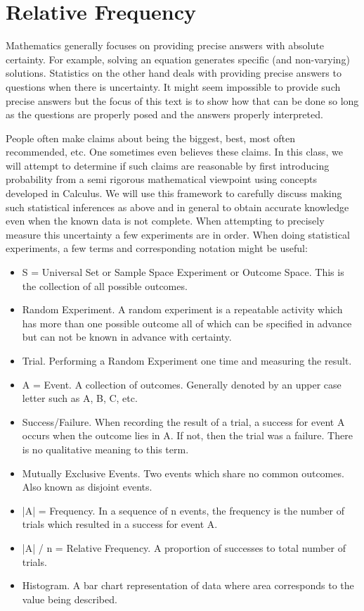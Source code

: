 \documentclass[10pt,]{book}
\theoremstyle{plain}
\theoremstyle{definition}
\theoremstyle{definition}
\theoremstyle{definition}
\numberwithin{equation}{section}
\begin{document}
\section[{Relative Frequency}]{Relative Frequency}\label{RelativeFrequency}
\typeout{************************************************}
\typeout{************************************************}
Mathematics generally focuses on providing precise answers with absolute certainty. For example, solving an equation generates specific (and non-varying) solutions. Statistics on the other hand deals with providing precise answers to questions when there is uncertainty. It might seem impossible to provide such precise answers but the focus of this text is to show how that can be done so long as the questions are properly posed and the answers properly interpreted.%
\par
People often make claims about being the biggest, best, most often recommended, etc. One sometimes even believes these claims. In this class, we will attempt to determine if such claims are reasonable by first introducing probability from a semi rigorous mathematical viewpoint using concepts developed in Calculus. We will use this framework to carefully discuss making such statistical inferences as above and in general to obtain accurate knowledge even when the known data is not complete. %
When attempting to precisely measure this uncertainty a few experiments are in order. When doing statistical experiments, a few terms and corresponding notation might be useful:%
\leavevmode%
\begin{itemize}[label=\textbullet]
\item{}S = Universal Set or Sample Space Experiment or Outcome Space. 
		This is the collection of all possible outcomes.%
\item{}Random Experiment. A random experiment is a repeatable activity which has more than one
		possible outcome all of which can be specified in advance but can not be known in advance with certainty.%
\item{}Trial. Performing a Random Experiment one time and measuring the result.%
\item{}A = Event. A collection of outcomes.  Generally denoted by an upper case letter such as A, B, C, etc.%
\item{}Success/Failure. When recording the result of a trial, a success for event A occurs when the outcome
		lies in A. If not, then the trial was a failure. There is no qualitative meaning to this term.%
\item{}Mutually Exclusive Events. Two events which share no common outcomes. Also known as disjoint events.%
\item{}|A| = Frequency. In a sequence of n events, the frequency is the number of trials which resulted in 
		a success for event A.%
\item{}|A| / n = Relative Frequency. A proportion of successes to total number of trials.%
\item{}Histogram. A bar chart representation of data where area corresponds to the value being described.%
\end{itemize}
\end{document}
